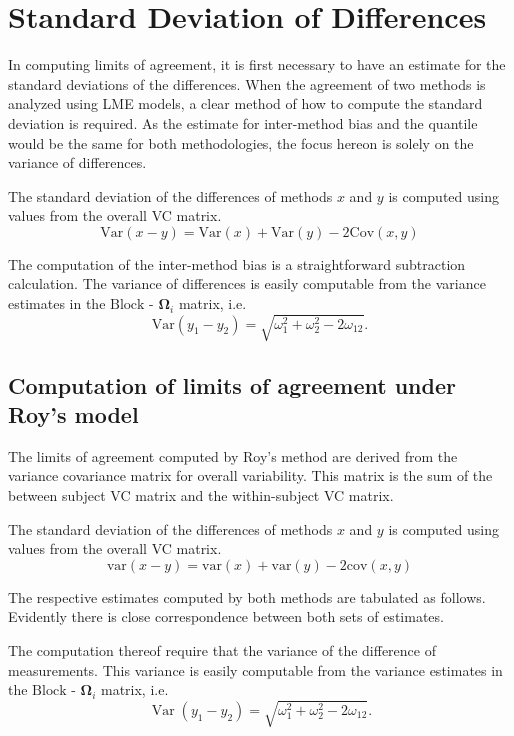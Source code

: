 \documentclass[12pt, a4paper]{report}
\theoremstyle{plain}
\theoremstyle{definition}
\theoremstyle{remark}
\begin{document}



\section{Standard Deviation of Differences}
In computing limits of agreement, it is first necessary to have an estimate for the standard deviations of the differences. When the agreement of two methods is analyzed using LME models, a clear method of how to compute the standard deviation is required. As the estimate for inter-method bias and the quantile would be the same for both methodologies, the focus hereon is solely on the variance of differences.

The standard deviation of the differences of methods $x$ and $y$ is computed using values from the overall VC matrix.
\[
\mbox{Var}(x - y ) = \mbox{Var} ( x )  + \mbox{Var} ( y ) - 2\mbox{Cov} ( x ,y )
\]

The computation of the inter-method bias is a straightforward subtraction calculation. The variance of differences is easily computable from the variance estimates in the ${\mbox{Block - }\boldsymbol \Omega_{i}}$ matrix, i.e.
\[
\mathrm{Var}(y_1 - y_2) = \sqrt{ \omega^2_1 + \omega^2_2 - 2\omega_{12}}.
\]
\subsection{Computation of limits of agreement under Roy's model}
The limits of agreement computed by Roy's method are derived from the variance covariance matrix for overall variability.
This matrix is the sum of the between subject VC matrix and the within-subject VC matrix.

The standard deviation of the differences of methods $x$ and $y$ is computed using values from the overall VC matrix.
\[
\mbox{var}(x - y ) = \mbox{var} ( x )  + \mbox{var} ( y ) - 2\mbox{cov} ( x ,y )
\]


The respective estimates computed by both methods are tabulated as follows. Evidently there is close correspondence between both sets of estimates.

The computation thereof require that the variance of the difference of measurements. This variance is easily computable from the  variance estimates in the ${\mbox{Block - }\boldsymbol \Omega_{i}}$ matrix, i.e.
\[
\operatorname{Var}(y_1 - y_2) = \sqrt{ \omega^2_1 + \omega^2_2 - 2\omega_{12}}.
\]
\end{document}
